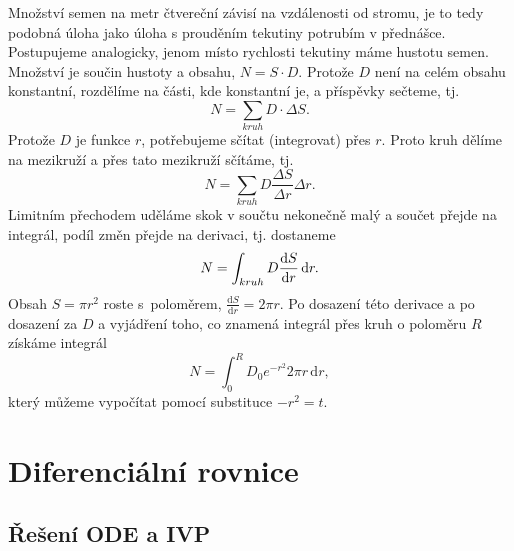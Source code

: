 \reseni Množství semen na metr čtvereční závisí na vzdálenosti od
stromu, je to tedy podobná úloha jako úloha s prouděním tekutiny
potrubím v přednášce. Postupujeme analogicky, jenom místo rychlosti tekutiny
máme hustotu semen.  Množství je součin hustoty a obsahu, $N=S\cdot D$. Protože $D$ není na celém obsahu konstantní, rozdělíme na části, kde konstantní je, a příspěvky sečteme, tj. $$N=\sum_{kruh} D\cdot\Delta S.$$ Protože $D$ je funkce $r$, potřebujeme sčítat (integrovat) přes $r$. Proto kruh dělíme na mezikruží a přes tato mezikruží sčítáme, tj. 
$$N=\sum_{kruh} D \frac{\Delta S}{\Delta r}\Delta r.$$ Limitním přechodem uděláme skok v součtu nekonečně malý a součet přejde na integrál, podíl změn přejde na derivaci, tj. dostaneme
$$N=\int_{kruh} D \frac{\mathrm{d}S}{\mathrm{d}r}\,\mathrm d r.$$
Obsah $S=\pi r^2$
roste s poloměrem, $\frac {\mathrm dS}{\mathrm dr}=2\pi r$. Po dosazení této derivace a po dosazení za $D$ a vyjádření toho, co znamená integrál přes kruh o poloměru $R$ získáme integrál
$$N=\int _0^R D_0e^{-r^2}2\pi r\,\mathrm dr,$$
který můžeme vypočítat pomocí substituce $-r^2=t$.

\konec


\stranka
\section{Diferenciální rovnice}

\stranka

\subsection{Řešení ODE a IVP} 


